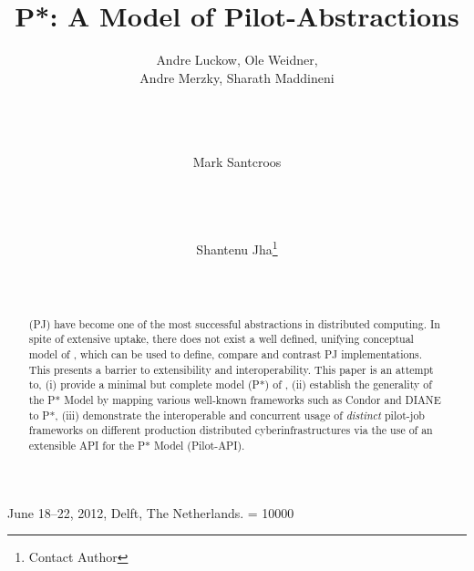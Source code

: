 \documentclass{sig-alt-release2}
\begin{document}
 {June 18--22, 2012, Delft, The Netherlands.} 
\widowpenalty = 10000





\title{P*: A Model of Pilot-Abstractions\up}

\author{
\alignauthor Andre Luckow, Ole Weidner, \\Andre Merzky, Sharath Maddineni\\
       \\
       \\
        \\
\and
\alignauthor Mark Santcroos\\
       \\
       \\
       \\
\and
\alignauthor Shantenu Jha\footnote{Contact Author}\\
      \\
     \\
}

\date{}

\maketitle

\let\thefootnote\relax{}

\vspace{-2cm}
\begin{abstract} 
  \pilotjobs (PJ) have become one of the most successful abstractions in
  distributed computing. In spite of extensive uptake, there does not
  exist a well defined, unifying conceptual model of \pilotjobs, which
  can be used to define, compare and contrast PJ
  implementations. This presents a barrier to extensibility and
  interoperability. This paper is an attempt to, (i) provide a minimal
  but complete model (P*) of \pilotjobs, (ii) establish the generality
  of the P* Model by mapping various well-known \pilotjob
  frameworks such as Condor and DIANE to P*, (iii) demonstrate the
  interoperable and concurrent usage of {\it distinct} pilot-job
  frameworks on different production distributed cyberinfrastructures
  via the use of an extensible API for the P* Model (Pilot-API).
\end{abstract}
\end{document}
